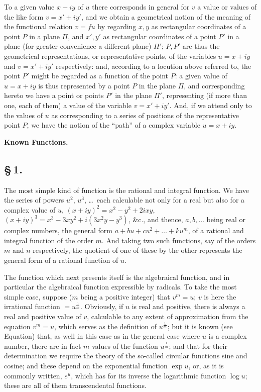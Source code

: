 \documentclass[11pt,a4paper]{book}
\begin{document}
To a given value $x + iy$ of $u$ there corresponds in general for $v$ a value or values of the like form $v = x' + iy'$, and we obtain a geometrical notion of the meaning of the functional relation $v = fu$ by regarding $x, y$ as rectangular coordinates of a point $P$ in a plane $\Pi$, and $x', y'$ as rectangular coordinates of a point $P'$ in a plane (for greater convenience a different plane) $\Pi'$; $P, P'$ are thus the geometrical representations, or representative points, of the variables $u = x + iy$ and $v = x' + iy'$ respectively: and, according to a locution above referred to, the point $P'$ might be regarded as a function of the point $P$: a given value of $u = x + iy$ is thus represented by a point $P$ in the plane $\Pi$, and corresponding hereto we have a point or points $P'$ in the plane $\Pi'$, representing (if more than one, each of them) a value of the variable $v = x' + iy'$. And, if we attend only to the values of $u$ as corresponding to a series of positions of the representative point $P$, we have the notion of the ``path'' of a complex variable $u = x + iy$.

\smallskip
\begin{center}\textbf{Known Functions.}\end{center}

\subsection*{\S\,1.}

The most simple kind of function is the rational and integral function. We have the series of powers $u^{2}$, $u^{3}$, \ldots\ each calculable not only for a real but also for a complex value of $u$, $(x + iy)^{2} = x^{2} - y^{2} + 2ixy$, $(x + iy)^{3} = x^{3} - 3xy^{2} + i(3x^{2}y - y^{3})$, \&c., and thence, $a, b, \ldots$ being real or complex numbers, the general form $a + bu + cu^{2} + \ldots + ku^{m}$, of a rational and integral function of the order $m$. And taking two such functions, say of the orders $m$ and $n$ respectively, the quotient of one of these by the other represents the general form of a rational function of $u$.

The function which next presents itself is the algebraical function, and in particular the algebraical function expressible by radicals. To take the most simple case, suppose ($m$ being a positive integer) that $v^{m} = u$; $v$ is here the irrational function $= u^{\frac{1}{m}}$. Obviously, if $u$ is real and positive, there is always a real and positive value of $v$, calculable to any extent of approximation from the equation $v^{m} = u$, which serves as the definition of $u^{\frac{1}{m}}$; but it is known (see Equation) that, as well in this case as in the general case where $u$ is a complex number, there are in fact $m$ values of the function $u^{\frac{1}{m}}$; and that for their determination we require the theory of the so-called circular functions sine and cosine; and these depend on the exponential function $\exp u$, or, as it is commonly written, $e^{u}$, which has for its inverse the logarithmic function $\log u$; these are all of them transcendental functions.
\end{document}
